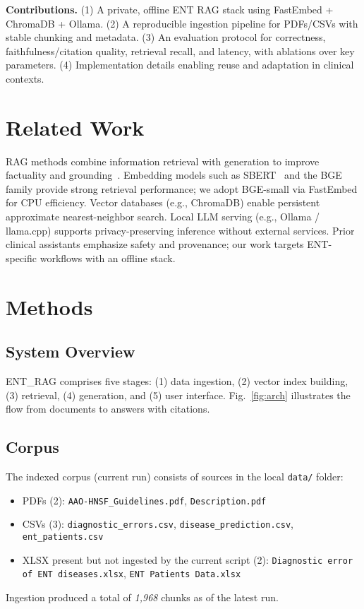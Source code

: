 \documentclass[conference]{IEEEtran}
\begin{document}
\textbf{Contributions.} (1) A private, offline ENT RAG stack using FastEmbed + ChromaDB + Ollama. (2) A reproducible ingestion pipeline for PDFs/CSVs with stable chunking and metadata. (3) An evaluation protocol for correctness, faithfulness/citation quality, retrieval recall, and latency, with ablations over key parameters. (4) Implementation details enabling reuse and adaptation in clinical contexts.

\section{Related Work}
RAG methods combine information retrieval with generation to improve factuality and grounding~\cite{lewis2020rag}. Embedding models such as SBERT~\cite{reimers2019sbert} and the BGE family provide strong retrieval performance; we adopt BGE-small via FastEmbed for CPU efficiency. Vector databases (e.g., ChromaDB) enable persistent approximate nearest-neighbor search. Local LLM serving (e.g., Ollama / llama.cpp) supports privacy-preserving inference without external services. Prior clinical assistants emphasize safety and provenance; our work targets ENT-specific workflows with an offline stack.

\section{Methods}
\subsection{System Overview}
ENT\_RAG comprises five stages: (1) data ingestion, (2) vector index building, (3) retrieval, (4) generation, and (5) user interface. Fig.~\ref{fig:arch} illustrates the flow from documents to answers with citations.

\subsection{Corpus}
The indexed corpus (current run) consists of sources in the local \texttt{data/} folder:
\begin{itemize}
	\item PDFs (2): \texttt{AAO-HNSF\_Guidelines.pdf}, \texttt{Description.pdf}
	\item CSVs (3): \texttt{diagnostic\_errors.csv}, \texttt{disease\_prediction.csv}, \texttt{ent\_patients.csv}
	\item XLSX present but not ingested by the current script (2): \texttt{Diagnostic error of ENT diseases.xlsx}, \texttt{ENT Patients Data.xlsx}
\end{itemize}
Ingestion produced a total of \emph{1{,}968} chunks as of the latest run.
\end{document}
